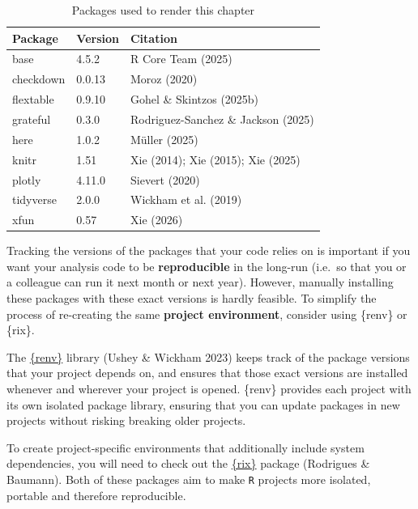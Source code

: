 \documentclass[
  letterpaper,
  DIV=11,
  numbers=noendperiod]{scrreprt}
\begin{document}
{

\begin{longtable}[]{@{}lll@{}}

\caption{\label{tbl-packages}Packages used to render this chapter}

\tabularnewline

\toprule\noalign{}
Package & Version & Citation \\
\midrule\noalign{}
\endhead
\bottomrule\noalign{}
\endlastfoot
base & 4.5.2 &
R Core Team (2025) \\
checkdown & 0.0.13 &
Moroz (2020) \\
flextable & 0.9.10 &
Gohel \& Skintzos (2025b) \\
grateful & 0.3.0 &
Rodriguez-Sanchez \& Jackson (2025) \\
here & 1.0.2 &
Müller (2025) \\
knitr & 1.51 &
Xie (2014);
Xie (2015);
Xie (2025) \\
plotly & 4.11.0 &
Sievert (2020) \\
tidyverse & 2.0.0 &
Wickham et al. (2019) \\
xfun & 0.57 &
Xie (2026) \\

\end{longtable}

}

Tracking the versions of the packages that your code relies on is
important if you want your analysis code to be \textbf{reproducible} in
the long-run (i.e.~so that you or a colleague can run it next month or
next year). However, manually installing these packages with these exact
versions is hardly feasible. To simplify the process of re-creating the
same \textbf{project environment}, consider using \{renv\} or \{rix\}.

The \href{https://rstudio.github.io/renv/index.html}{\{renv\}} library
(Ushey \& Wickham 2023) keeps track of the package versions that your
project depends on, and ensures that those exact versions are installed
whenever and wherever your project is opened. \{renv\} provides each
project with its own isolated package library, ensuring that you can
update packages in new projects without risking breaking older projects.

To create project-specific environments that additionally include system
dependencies, you will need to check out the
\href{https://docs.ropensci.org/rix/}{\{rix\}} package (Rodrigues \&
Baumann). Both of these packages aim to make \texttt{R} projects more
isolated, portable and therefore reproducible.
\end{document}
